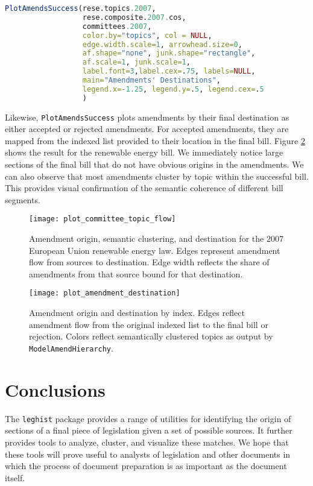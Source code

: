 \documentclass[11pt]{article}
\begin{document}
\begin{lstlisting}[language=R, numbers=none]
PlotAmendsSuccess(rese.topics.2007,
                  rese.composite.2007.cos,
                  committees.2007,
                  color.by="topics", col = NULL,
                  edge.width.scale=1, arrowhead.size=0,
                  af.shape="none", junk.shape="rectangle",
                  af.scale=1, junk.scale=1,
                  label.font=3,label.cex=.75, labels=NULL,
                  main="Amendments' Destinations",
                  legend.x=-1.25, legend.y=.5, legend.cex=.5
                  )
\end{lstlisting}

Likewise, \texttt{PlotAmendsSuccess} plots amendments by their final
destination as either accepted or rejected amendments. For accepted
amendments, they are mapped from the indexed list provided to their
location in the final bill. Figure \ref{fig:amend-dest} shows the
result for the renewable energy bill. We immediately notice large
sections of the final bill that do not have obvious origins in the
amendments. We can also observe that most amendments cluster by topic
within the successful bill. This provides visual confirmation of the
semantic coherence of different bill segments.

\begin{figure}[ht]
  \centering
  \texttt{[image: plot\_committee\_topic\_flow]}
  \caption{Amendment origin, semantic clustering, and destination for the 2007 European Union renewable energy law. Edges represent amendment flow from sources to destination. Edge width reflects the share of amendments from that source bound for that destination. }
  \label{fig:amend-flow}
\end{figure}

\begin{figure}[ht]
  \centering
  \texttt{[image: plot\_amendment\_destination]}
  \caption{Amendment origin and destination by index. Edges reflect
    amendment flow from the original indexed list to the final bill or
  rejection. Colors reflect semantically clustered topics as output by
\texttt{ModelAmendHierarchy}.}
  \label{fig:amend-dest}
\end{figure}

\section{Conclusions}
\label{sec:conclusions}

The \texttt{leghist} package provides a range of utilities for
identifying the origin of sections of a final piece of legislation
given a set of possible sources. It further provides tools to analyze,
cluster, and visualize these matches. We hope that these tools will
prove useful to analysts of legislation and other documents in which
the process of document preparation is as important as the document
itself. 
\end{document}
